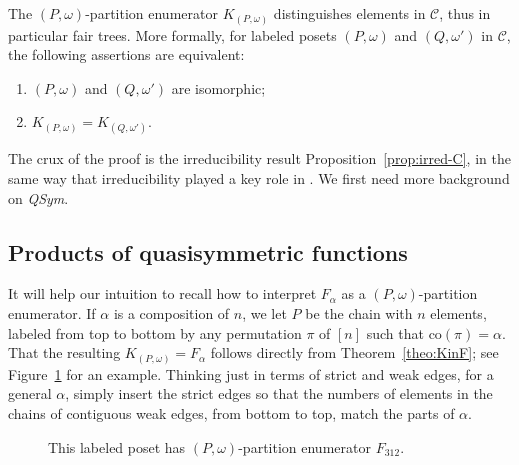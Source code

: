 \documentclass[ALCO,Unicode,published]{cedram}
\newcommand{\qsym}{{\it{QSym}}}
\newcommand{\om}{\omega}
\newcommand{\kpw}{K_{(P,\om)}}
\newcommand{\co}{\mathrm{co}}
\newcommand{\Cb}{\mathcal{C}}
\begin{document}
\begin{theorem}\label{thm:fair-trees}
The $(P,\om)$-partition enumerator $\kpw$ distinguishes elements in $\Cb$, 
thus in particular fair trees. More formally, for labeled posets $(P,\om)$ and $(Q,\om')$ in $\Cb$,
the following assertions are equivalent:
\begin{enumerate}
\item $(P,\om)$ and $(Q,\om')$ are isomorphic;
\item $\kpw=K_{(Q,\om')}$.
\end{enumerate}
\end{theorem}

The crux of the proof is the irreducibility result Proposition~\ref{prop:irred-C}, in the same way that irreducibility played a key role in \cite{HaTs17,LiWe21}.  We first need more background on \qsym.

\subsection{Products of quasisymmetric functions}\label{sub:prods_qsym}

It will help our intuition to recall how to interpret $F_\alpha$ as a $(P,\om)$-partition enumerator.  If $\alpha$ is a composition of $n$, we let $P$ be the chain with $n$ elements, labeled from top to bottom by any permutation $\pi$ of $[n]$ such that $\co(\pi) = \alpha$.  That the resulting $\kpw = F_\alpha$ follows directly from Theorem~\ref{theo:KinF}; see Figure~\ref{fig:f_poset} for an example.  Thinking just in terms of strict and weak edges, for a general $\alpha$, simply insert the strict edges so that the numbers of elements in the chains of contiguous weak edges, from bottom to top, match the parts of $\alpha$.
\begin{figure}
\begin{center}
\end{center}
\caption{This labeled poset has $(P,\om)$-partition enumerator $F_{312}$.}
\label{fig:f_poset}
\end{figure}
\end{document}
